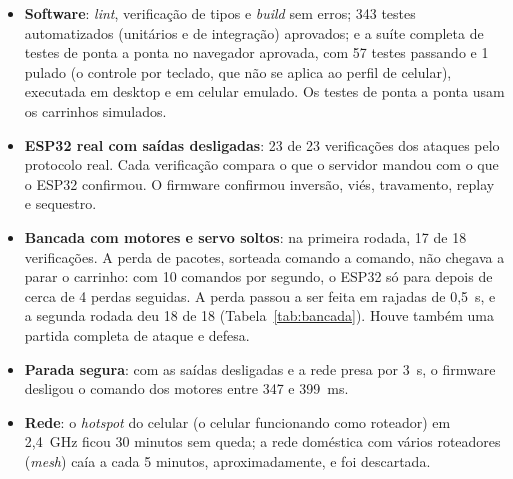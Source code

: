 \documentclass[12pt,openright,oneside,a4paper,english,brazil]{abntex2}
\begin{document}
\begin{itemize}
  \item \textbf{Software}: \emph{lint}, verificação de tipos e \emph{build} sem erros; 343 testes automatizados (unitários e de integração) aprovados; e a suíte completa de testes de ponta a ponta no navegador aprovada, com 57 testes passando e 1 pulado (o controle por teclado, que não se aplica ao perfil de celular), executada em desktop e em celular emulado. Os testes de ponta a ponta usam os carrinhos simulados.
  \item \textbf{ESP32 real com saídas desligadas}: 23 de 23 verificações dos ataques pelo protocolo real. Cada verificação compara o que o servidor mandou com o que o ESP32 confirmou. O firmware confirmou inversão, viés, travamento, replay e sequestro.
  \item \textbf{Bancada com motores e servo soltos}: na primeira rodada, 17 de 18 verificações. A perda de pacotes, sorteada comando a comando, não chegava a parar o carrinho: com 10 comandos por segundo, o ESP32 só para depois de cerca de 4 perdas seguidas. A perda passou a ser feita em rajadas de 0,5~s, e a segunda rodada deu 18 de 18 (Tabela~\ref{tab:bancada}). Houve também uma partida completa de ataque e defesa.
  \item \textbf{Parada segura}: com as saídas desligadas e a rede presa por 3~s, o firmware desligou o comando dos motores entre 347 e 399~ms.
  \item \textbf{Rede}: o \emph{hotspot} do celular (o celular funcionando como roteador) em 2,4~GHz ficou 30 minutos sem queda; a rede doméstica com vários roteadores (\emph{mesh}) caía a cada 5 minutos, aproximadamente, e foi descartada.
\end{itemize}
\end{document}
